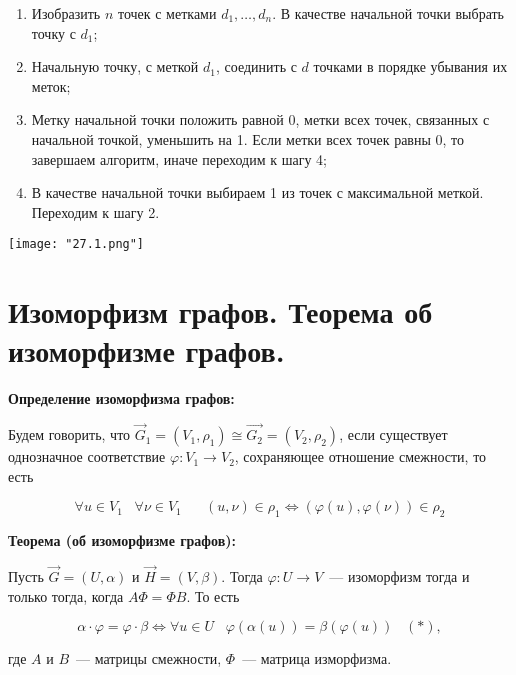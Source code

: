     \begin{enumerate}
        \item{Изобразить $n$ точек с метками $d_1, \dots, d_n$. В качестве
        начальной точки выбрать точку с $d_1$;}
        \item{Начальную точку, с меткой $d_1$, соединить с $d$ точками в порядке
        убывания их меток;}
        \item{Метку начальной точки положить равной $0$, метки всех точек,
        связанных с начальной точкой, уменьшить на 1. Если метки всех точек
        равны 0, то завершаем алгоритм, иначе переходим к шагу 4;}
        \item{В качестве начальной точки выбираем 1 из точек с максимальной меткой.
        Переходим к шагу 2.}
    \end{enumerate}
    \bigskip

    \begin{center}
        \texttt{[image: "27.1.png"]}
    \end{center}

\section{Изоморфизм графов. Теорема об изоморфизме графов.}

\textbf{Определение изоморфизма графов:}
    \smallskip

    Будем говорить, что $\overrightarrow{G}_1 = (V_1, \rho_1) \cong 
    \overrightarrow{G_2} = (V_2, \rho_2)$, если существует однозначное
    соответствие $\varphi: V_1 \to V_2$, сохраняющее отношение смежности,
    то есть 
    
    \[
        \forall u \in V_1 \;\;\; \forall \nu \in V_1 \;\;\;\;\;\;
        (u, \nu) \in \rho_1 \Leftrightarrow (\varphi(u), \varphi(\nu)) \in \rho_2
    \]
    \bigskip

\textbf{Теорема (об изоморфизме графов):}
    \smallskip
    
    Пусть $\overrightarrow{G} = (U, \alpha)$ и $\overrightarrow{H} = (V, \beta)$.
    Тогда $\varphi: U \to V$~--- изоморфизм тогда и только тогда, когда
    $A \Phi = \Phi B$. То есть

    \[
        \alpha \cdot \varphi = \varphi \cdot \beta \Leftrightarrow
        \forall u \in U \;\;\; \varphi(\alpha(u)) = \beta (\varphi(u)) \;\;\; (*),  
    \]

    где $A$ и $B$~--- матрицы смежности, $\Phi$~--- матрица изморфизма.
    \bigskip

